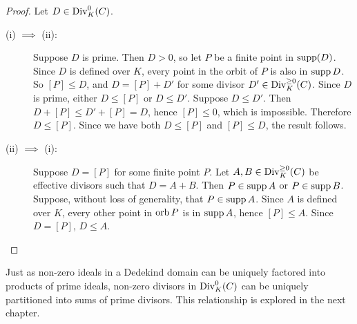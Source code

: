 \begin{proof}
  Let $D \in \operatorname{Div}_K^0(C)$.
  \begin{description}
    \item[(i) $\implies$ (ii):]
      Suppose $D$ is prime.
      Then $D > 0$, so let $P$ be a finite point in $\operatorname{supp}(D)$.
      Since $D$ is defined over $K$, every point in the orbit of $P$ is also in $\operatorname{supp} D$.
      So $[P] \leq D$, and $D = [P] + D'$ for some divisor $D' \in \operatorname{Div}_K^{\geq 0}(C)$.
      Since $D$ is prime, either $D \leq [P]$ or $D \leq D'$.
      Suppose $D \leq D'$.
      Then $D + [P] \leq D' + [P] = D$, hence $[P] \leq 0$, which is impossible.
      Therefore $D \leq [P]$.
      Since we have both $D \leq [P]$ and $[P] \leq D$, the result follows.
      
    \item[(ii) $\implies$ (i):]
      Suppose $D = [P]$ for some finite point $P$.
      Let $A, B \in \operatorname{Div}_K^{\geq 0}(C)$ be effective divisors such that $D = A + B$.
      Then $P \in \operatorname{supp} A$ or $P \in \operatorname{supp} B$.
      Suppose, without loss of generality, that $P \in \operatorname{supp} A$.
      Since $A$ is defined over $K$, every other point in $\operatorname{orb} P$ is in $\operatorname{supp} A$, hence $[P] \leq A$.
      Since $D = [P]$, $D \leq A$.
  \end{description}
\end{proof}

Just as non-zero ideals in a Dedekind domain can be uniquely factored into products of prime ideals,
non-zero divisors in $\operatorname{Div}_K^0(C)$ can be uniquely partitioned into sums of prime divisors.
This relationship is explored in the next chapter.
